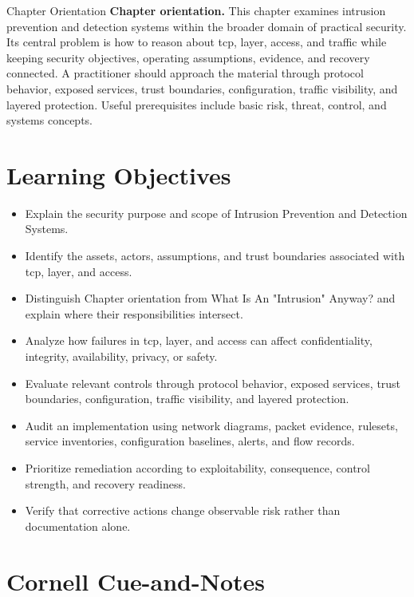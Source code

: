 \documentclass[11pt,letterpaper]{article}
\title{\CornellDocumentTitle}
\author{}
\date{}
\begin{document}
\maketitle
\begin{CornellOverviewBox}{Chapter Orientation}
\textbf{Chapter orientation.} This chapter examines intrusion prevention and detection systems within the broader domain of practical security. Its central problem is how to reason about tcp, layer, access, and traffic while keeping security objectives, operating assumptions, evidence, and recovery connected. A practitioner should approach the material through protocol behavior, exposed services, trust boundaries, configuration, traffic visibility, and layered protection. Useful prerequisites include basic risk, threat, control, and systems concepts.
\end{CornellOverviewBox}
\section*{Learning Objectives}
\begin{itemize}
\item Explain the security purpose and scope of Intrusion Prevention and Detection Systems.
\item Identify the assets, actors, assumptions, and trust boundaries associated with tcp, layer, and access.
\item Distinguish Chapter orientation from What Is An "Intrusion" Anyway? and explain where their responsibilities intersect.
\item Analyze how failures in tcp, layer, and access can affect confidentiality, integrity, availability, privacy, or safety.
\item Evaluate relevant controls through protocol behavior, exposed services, trust boundaries, configuration, traffic visibility, and layered protection.
\item Audit an implementation using network diagrams, packet evidence, rulesets, service inventories, configuration baselines, alerts, and flow records.
\item Prioritize remediation according to exploitability, consequence, control strength, and recovery readiness.
\item Verify that corrective actions change observable risk rather than documentation alone.
\end{itemize}
\section*{Cornell Cue-and-Notes}
\end{document}
